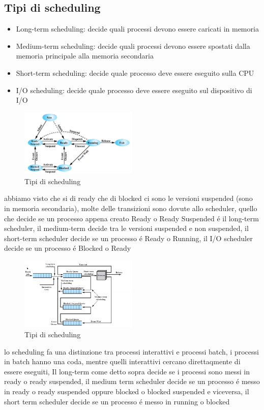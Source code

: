     \subsection{Tipi di scheduling}
    \begin{itemize}
        \item Long-term scheduling: decide quali processi devono essere caricati in memoria
        \item Medium-term scheduling: decide quali processi devono essere spostati dalla memoria principale alla memoria secondaria
        \item Short-term scheduling: decide quale processo deve essere eseguito sulla CPU
        \item I/O scheduling: decide quale processo deve essere eseguito sul dispositivo di I/O
    \end{itemize}
    \begin{figure}[H]
        \centering
        \includegraphics[width=0.5\textwidth]{immagini/7State}
        \caption{Tipi di scheduling}
    \end{figure}
    abbiamo visto che si di ready che di blocked ci sono le versioni suspended (sono in memoria secondaria), molte
    delle transizioni sono dovute allo scheduler, quello che decide se un processo appena creato Ready o Ready Suspended
    é il long-term scheduler, il medium-term decide tra le versioni suspended e non suspended, il short-term scheduler
    decide se un processo é Ready o Running, il I/O scheduler decide se un processo é Blocked o Ready
    \begin{figure}[H]
        \centering
        \includegraphics[width=0.5\textwidth]{immagini/implementazioneScheduling}
        \caption{Tipi di scheduling}
    \end{figure}
    lo scheduling fa una distinzione tra processi interattivi e processi batch, i processi in batch hanno una coda, mentre
    quelli interattivi cercano direttaqmente di essere eseguiti, Il long-term come detto sopra decide se i processi sono
    messi in ready o ready suspended, il medium term scheduler decide se un processo é messo in ready o ready suspended
    oppure blocked o blocked suspended e viceversa, il short term scheduler decide se un processo é messo in running o blocked

